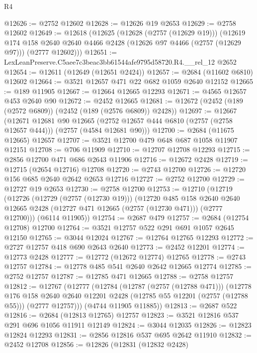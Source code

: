 \begin{lexlean}{R4}
\begin{coremodule}
@12626 := @2752 @12602
@12628 := @12626 @19 @2653
@12629 := @2758 @12602
@12649 := @12618
    (@12625
      (@12628 (@2757 (@12629 @19)))
      (@12619
        @174
        @158
        @2640
        @2640
        @4466
        @2428
        (@12626 @97 @4466 (@2757 (@12629 @97)))
        (@2777 @12602)))
@12651 := LexLeanPreserve.C5aee7c3beac3bb61544afe9795d58720.R4.__rel_12 @2652
@12654 := @12611 (@12649 (@12651 @2424))
@12657 := @2684 (@11602 @6810) @12602
@12664 := @3521 @12657 @471 @22 @682 @1059 @2640 @12152
@12665 := @189 @11905
@12667 := @12664 @12665 @12293
@12671 := @4565 @12657 @453 @2640 @90
@12672 := @2452 @12665
@12681 := @12672 (@2452 (@189 (@2572 @6809)) (@2452 (@189 (@2576 @6809)) @2428))
@12697 := @12667
    (@12671
      @12681
      @90
      @12665
      (@2752 @12657 @444 @6810 (@2757 (@2758 @12657 @444)))
      (@2757 (@4584 @12681 @90)))
@12700 := @2684 (@11675 @12665) @12657
@12707 := @3521 @12700 @479 @648 @687 @1058 @11907 @12151
@12708 := @706 @11909
@12710 := @12707 @12708 @12293
@12715 := @2856 @12700 @471 @686 @2643 @11906
@12716 := @12672 @2428
@12719 := @12715 (@2654 @12716) @12708
@12720 := @2743 @12700
@12726 := @12720 @156 @685 @2640 @2642 @2653 @12716
@12727 := @2752 @12700
@12729 := @12727 @19 @2653
@12730 := @2758 @12700
@12753 := @12710
    (@12719
      (@12726
        (@12729 (@2757 (@12730 @19)))
        (@12720
          @485
          @158
          @2640
          @2640
          @12665
          @2428
          (@12727 @471 @12665 (@2757 (@12730 @471)))
          (@2777 @12700)))
      (@6114 @11905))
@12754 := @2687 @479
@12757 := @2684 (@12754 @12708) @12700
@12764 := @3521 @12757 @522 @291 @691 @1057 @2645 @12150
@12765 := @3044 @12024
@12767 := @12764 @12765 @12293
@12772 := @2727 @12757 @418 @690 @2643 @2640
@12773 := @2452 @12201
@12774 := @12773 @2428
@12777 := @12772 (@12672 @12774) @12765
@12778 := @2743 @12757
@12784 := @12778 @485 @541 @2640 @2642 @12665 @12774
@12785 := @2752 @12757
@12787 := @12785 @471 @12665
@12788 := @2758 @12757
@12812 := @12767
    (@12777
      (@12784
        (@12787 (@2757 (@12788 @471)))
        (@12778
          @176
          @158
          @2640
          @2640
          @12201
          @2428
          (@12785 @55 @12201 (@2757 (@12788 @55)))
          (@2777 @12757)))
      (@4744 @11905 @11885))
@12813 := @2687 @522
@12816 := @2684 (@12813 @12765) @12757
@12823 := @3521 @12816 @537 @291 @696 @1056 @11911 @12149
@12824 := @3044 @12035
@12826 := @12823 @12824 @12293
@12831 := @2856 @12816 @537 @695 @2642 @11910
@12832 := @2452 @12708
@12856 := @12826
    (@12831
      (@12832 @2428)

\end{coremodule}
\end{lexlean}
